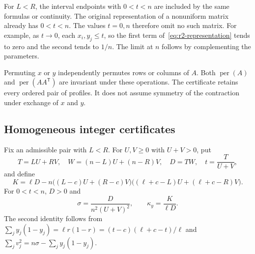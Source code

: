 \documentclass[11pt,a4paper]{article}
\theoremstyle{definition}
\theoremstyle{remark}
\newcommand{\per}{\operatorname{per}}
\newcommand{\T}{\mathsf{T}}
\begin{document}
For $L<R$, the interval endpoints with $0<t<n$ are included by the same formulas or continuity.
The original representation of a nonuniform matrix already has $0<t<n$.
The values $t=0,n$ therefore omit no such matrix.
For example, as $t\to0$, each $x_i,y_j\le t$, so the first term of~\eqref{eq:r2-representation} tends to zero and the second tends to $1/n$.
The limit at $n$ follows by complementing the parameters.

Permuting $x$ or $y$ independently permutes rows or columns of $A$.
Both $\per(A)$ and $\per(AA^\T)$ are invariant under these operations.
The certificate retains every ordered pair of profiles.
It does not assume symmetry of the contraction under exchange of $x$ and $y$.

\subsection{Homogeneous integer certificates}

Fix an admissible pair with $L<R$.
For $U,V\ge0$ with $U+V>0$, put
\[
T=LU+RV,\quad W=(n-L)U+(n-R)V,\quad
D=TW,\quad t=\frac{T}{U+V},
\]
and define
\begin{equation}\label{eq:r2-K}
K=\ell D-n\bigl((L-c)U+(R-c)V\bigr)
                 \bigl((\ell+c-L)U+(\ell+c-R)V\bigr).
\end{equation}
For $0<t<n$, $D>0$ and
\[
\sigma=\frac{D}{n^2(U+V)^2},\qquad \kappa_y=\frac{K}{\ell D}.
\]
The second identity follows from
$\sum_j y_j(1-y_j)=\ell r(1-r)=(t-c)(\ell+c-t)/\ell$
and $\sum_jv_j^2=n\sigma-\sum_jy_j(1-y_j)$.
\end{document}
